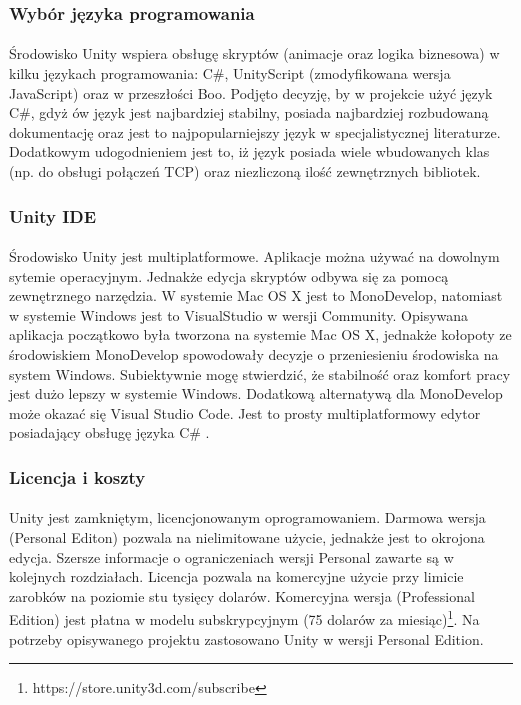 \subsubsection{Wybór języka programowania}
\paragraph{}
Środowisko Unity wspiera obsługę skryptów (animacje oraz logika biznesowa) w kilku językach programowania: C\#, UnityScript (zmodyfikowana wersja JavaScript)  oraz w przeszłości Boo. Podjęto decyzję, by w projekcie użyć język C\#, gdyż ów język jest najbardziej stabilny, posiada najbardziej rozbudowaną dokumentację oraz jest to najpopularniejszy język w specjalistycznej literaturze. Dodatkowym udogodnieniem  jest to, iż  język posiada wiele wbudowanych klas (np. do obsługi połączeń TCP) oraz niezliczoną ilość zewnętrznych bibliotek.
\subsubsection{Unity IDE}
\paragraph{}
Środowisko Unity jest multiplatformowe. Aplikacje można używać na dowolnym sytemie operacyjnym. Jednakże edycja skryptów odbywa się za pomocą zewnętrznego narzędzia. W systemie Mac OS X jest to MonoDevelop, natomiast w systemie Windows jest to VisualStudio w wersji Community. Opisywana aplikacja początkowo była tworzona na systemie Mac OS X, jednakże kołopoty ze środowiskiem MonoDevelop spowodowały decyzje o przeniesieniu środowiska na system Windows. Subiektywnie mogę stwierdzić, że stabilność oraz komfort pracy jest dużo lepszy w systemie Windows.
Dodatkową alternatywą dla MonoDevelop może okazać się Visual Studio Code. Jest to prosty multiplatformowy edytor posiadający obsługę języka C\# .

\subsubsection{Licencja i koszty}
\paragraph{}
Unity jest zamkniętym, licencjonowanym oprogramowaniem. Darmowa wersja (Personal Editon) pozwala na nielimitowane użycie, jednakże jest to okrojona edycja. Szersze informacje o ograniczeniach wersji Personal zawarte są w kolejnych rozdziałach. Licencja pozwala na komercyjne użycie przy limicie zarobków na poziomie stu tysięcy dolarów.
Komercyjna wersja (Professional Edition) jest płatna w modelu subskrypcyjnym (75 dolarów za miesiąc)\footnote{https://store.unity3d.com/subscribe}.
Na potrzeby opisywanego projektu zastosowano Unity w wersji Personal Edition.

